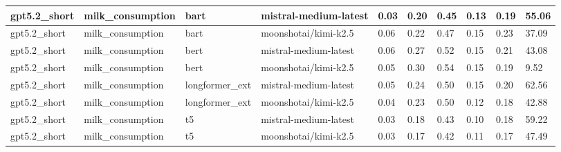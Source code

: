 \begin{tabular}{|l|l|l|l|l|l|l|l|l|l|}
 \hline
 gpt5.2\_short & milk\_consumption & bart & mistral-medium-latest & 0.03 & 0.20 & 0.45 & 0.13 & 0.19 & 55.06 \\
 \hline
 gpt5.2\_short & milk\_consumption & bart & moonshotai/kimi-k2.5 & 0.06 & 0.22 & 0.47 & 0.15 & 0.23 & 37.09 \\
 \hline
 gpt5.2\_short & milk\_consumption & bert & mistral-medium-latest & 0.06 & 0.27 & 0.52 & 0.15 & 0.21 & 43.08 \\
 \hline
 gpt5.2\_short & milk\_consumption & bert & moonshotai/kimi-k2.5 & 0.05 & 0.30 & 0.54 & 0.15 & 0.19 & 9.52 \\
 \hline
 gpt5.2\_short & milk\_consumption & longformer\_ext & mistral-medium-latest & 0.05 & 0.24 & 0.50 & 0.15 & 0.20 & 62.56 \\
 \hline
 gpt5.2\_short & milk\_consumption & longformer\_ext & moonshotai/kimi-k2.5 & 0.04 & 0.23 & 0.50 & 0.12 & 0.18 & 42.88 \\
 \hline
 gpt5.2\_short & milk\_consumption & t5 & mistral-medium-latest & 0.03 & 0.18 & 0.43 & 0.10 & 0.18 & 59.22 \\
 \hline
 gpt5.2\_short & milk\_consumption & t5 & moonshotai/kimi-k2.5 & 0.03 & 0.17 & 0.42 & 0.11 & 0.17 & 47.49 \\
\hline
\end{tabular}
